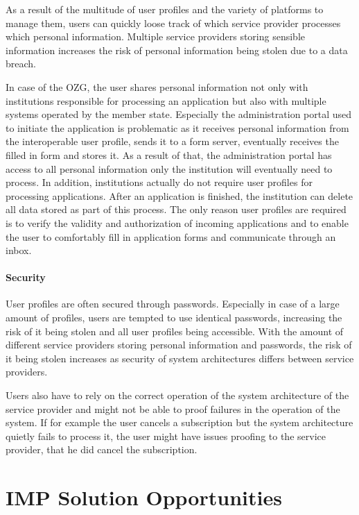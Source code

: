 As a result of the multitude of user profiles and the variety of platforms to manage them, users can quickly loose track of which service provider processes which personal information. Multiple service providers storing sensible information increases the risk of personal information being stolen due to a data breach.


In case of the OZG, the user shares personal information not only with institutions responsible for processing an application but also with multiple systems operated by the member state. Especially the administration portal used to initiate the application is problematic as it receives personal information from the interoperable user profile, sends it to a form server, eventually receives the filled in form and stores it. As a result of that, the administration portal has access to all personal information only the institution will eventually need to process. In addition, institutions actually do not require user profiles for processing applications. After an application is finished, the institution can delete all data stored as part of this process. The only reason user profiles are required is to verify the validity and authorization of incoming applications and to enable the user to comfortably fill in application forms and communicate through an inbox. 

\paragraph{Security}

User profiles are often secured through passwords. Especially in case of a large amount of profiles, users are tempted to use identical passwords, increasing the risk of it being stolen and all user profiles being accessible. With the amount of different service providers storing personal information and passwords, the risk of it being stolen increases as security of system architectures differs between service providers.

Users also have to rely on the correct operation of the system architecture of the service provider and might not be able to proof failures in the operation of the system. If for example the user cancels a subscription but the system architecture quietly fails to process it, the user might have issues proofing to the service provider, that he did cancel the subscription.


\section{IMP Solution Opportunities}

